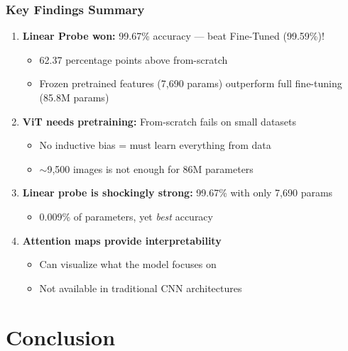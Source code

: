 \documentclass[aspectratio=169]{beamer}
\begin{document}
\begin{frame}
    \frametitle{Key Findings Summary}
    \small
    \begin{enumerate}
        \item \textbf{Linear Probe won:} 99.67\% accuracy --- beat Fine-Tuned (99.59\%)!
        \begin{itemize}
            \item 62.37 percentage points above from-scratch
            \item Frozen pretrained features (7,690 params) outperform full fine-tuning (85.8M params)
        \end{itemize}

        \item \textbf{ViT needs pretraining:} From-scratch fails on small datasets
        \begin{itemize}
            \item No inductive bias = must learn everything from data
            \item $\sim$9,500 images is not enough for 86M parameters
        \end{itemize}

        \item \textbf{Linear probe is shockingly strong:} 99.67\% with only 7,690 params
        \begin{itemize}
            \item 0.009\% of parameters, yet \textit{best} accuracy
        \end{itemize}

        \item \textbf{Attention maps provide interpretability}
        \begin{itemize}
            \item Can visualize what the model focuses on
            \item Not available in traditional CNN architectures
        \end{itemize}
    \end{enumerate}
\end{frame}

\section{Conclusion}
\end{document}
